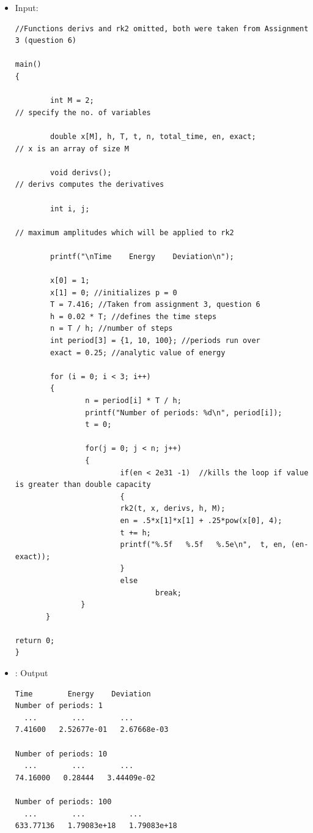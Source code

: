 \documentclass[10pt]{article}
\begin{document}
\begin{itemize}
\item Input:
\begin{verbatim}
//Functions derivs and rk2 omitted, both were taken from Assignment 3 (question 6)

main()
{
 
        int M = 2; 
// specify the no. of variables
 
        double x[M], h, T, t, n, total_time, en, exact; 
// x is an array of size M
 
        void derivs(); 
// derivs computes the derivatives
 
        int i, j;

// maximum amplitudes which will be applied to rk2

        printf("\nTime    Energy    Deviation\n");

        x[0] = 1;
        x[1] = 0; //initializes p = 0
        T = 7.416; //Taken from assignment 3, question 6
        h = 0.02 * T; //defines the time steps
        n = T / h; //number of steps
        int period[3] = {1, 10, 100}; //periods run over
        exact = 0.25; //analytic value of energy

        for (i = 0; i < 3; i++)
        {
                n = period[i] * T / h;
                printf("Number of periods: %d\n", period[i]);
                t = 0;
                
                for(j = 0; j < n; j++)
                {
                        if(en < 2e31 -1)  //kills the loop if value is greater than double capacity
                        { 
                        rk2(t, x, derivs, h, M);
                        en = .5*x[1]*x[1] + .25*pow(x[0], 4);
                        t += h;
                        printf("%.5f   %.5f   %.5e\n",  t, en, (en-exact));
                        }
                        else
                                break;
               }
       }

return 0;
}
\end{verbatim}
\item: Output
\begin{verbatim}
Time        Energy    Deviation
Number of periods: 1
  ...        ...        ...
7.41600   2.52677e-01   2.67668e-03

Number of periods: 10
  ...        ...        ...
74.16000   0.28444   3.44409e-02

Number of periods: 100
  ...        ...          ...
633.77136   1.79083e+18   1.79083e+18
\end{verbatim}


\end{itemize}
\end{document}
